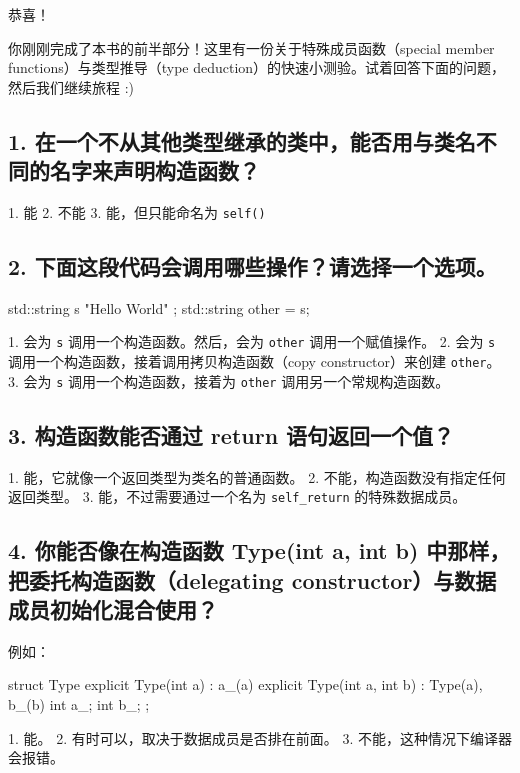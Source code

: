 恭喜！

你刚刚完成了本书的前半部分！这里有一份关于特殊成员函数（special member functions）与类型推导（type deduction）的快速小测验。试着回答下面的问题，然后我们继续旅程 :)

\subsection{1. 在一个不从其他类型继承的类中，能否用与类名不同的名字来声明构造函数？}

1. 能
2. 不能
3. 能，但只能命名为 \texttt{self()}

\subsection{2. 下面这段代码会调用哪些操作？请选择一个选项。}

\begin{codebox}[cpp]
std::string s { "Hello World" };
std::string other = s;
\end{codebox}

1. 会为 \texttt{s} 调用一个构造函数。然后，会为 \texttt{other} 调用一个赋值操作。
2. 会为 \texttt{s} 调用一个构造函数，接着调用拷贝构造函数（copy constructor）来创建 \texttt{other}。
3. 会为 \texttt{s} 调用一个构造函数，接着为 \texttt{other} 调用另一个常规构造函数。

\subsection{3. 构造函数能否通过 return 语句返回一个值？}

1. 能，它就像一个返回类型为类名的普通函数。
2. 不能，构造函数没有指定任何返回类型。
3. 能，不过需要通过一个名为 \texttt{self\_return} 的特殊数据成员。

\subsection{4. 你能否像在构造函数 Type(int a, int b) 中那样，把委托构造函数（delegating constructor）与数据成员初始化混合使用？}

例如：

\begin{codebox}[cpp]
struct Type {
    explicit Type(int a) : a_(a) { }
    explicit Type(int a, int b) : Type(a), b_(b) { }
    int a_;
    int b_;
};
\end{codebox}

1. 能。
2. 有时可以，取决于数据成员是否排在前面。
3. 不能，这种情况下编译器会报错。

